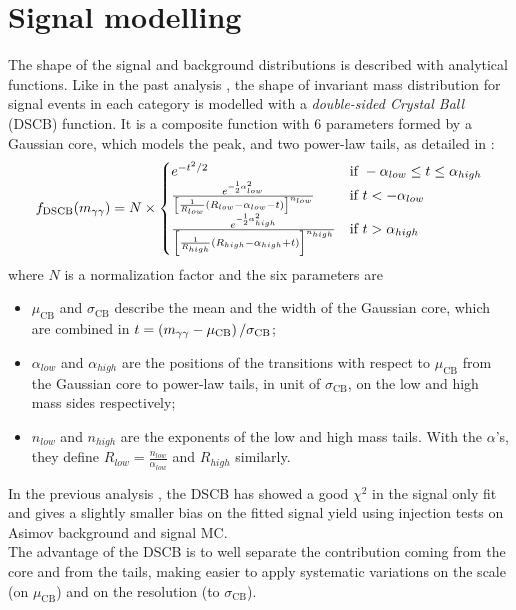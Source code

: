\section{Signal modelling}
\label{sec:signal_model}

The shape of the signal and background \myy distributions is described with analytical functions. Like in the past analysis \cite{Hasib:2238687}, the shape of \myy invariant mass distribution for signal events in each category is modelled with a \emph{double-sided Crystal Ball} (DSCB) function. It is a composite function with 6 parameters formed by a Gaussian core, which models the peak, and two power-law tails, as detailed in \Eqn{\ref{eq:DSCB}}:
\begin{align}
	f_\text{DSCB}(m_{\gamma\gamma}) = N \times
	\begin{cases}
		e^{-t^{2}/2} & \text{if } -\alpha_{low} \leq t \leq \alpha_{high} \\
		\frac{ e^{-{}^{1}_{2} \alpha_{low}^{2}} } { \left[ \frac{1}{R_{low}} \left(R_{low} - \alpha_{low} - t \right) \right]^{n_{low}} } & \text{if } t < -\alpha_{low} \\
		\frac{ e^{-{}^{1}_{2} \alpha_{high}^{2}} } { \left[ \frac{1}{R_{high}} \left(R_{high} - \alpha_{high} + t \right) \right]^{n_{high}} } & \text{if } t > \alpha_{high} \\
	\end{cases}
	\label{eq:DSCB}
\end{align}
where $N$ is a normalization factor and the six parameters are
\begin{itemize}
	\item $\mu_\text{CB}$ and $\sigma_\text{CB}$ describe the mean and the width of the Gaussian core, which are combined in $t = \left(m_{\gamma\gamma} - \mu_\text{CB}\right) / \sigma_\text{CB}$;
	\item $\alpha_{low}$ and $\alpha_{high}$ are the positions of the transitions with respect to $\mu_\text{CB}$ from the Gaussian core to power-law tails, in unit of $\sigma_\text{CB}$, on the low and high mass sides respectively;
	\item $n_{low}$ and $n_{high}$ are the exponents of the low and high mass tails. With the $\alpha$'s, they define $R_{low} = \frac{n_{low}}{\alpha_{low}}$ and $R_{high}$ similarly.
\end{itemize}

In the previous analysis \cite{Hasib:2238687}, the DSCB has showed a good $\chi^2$ in the signal only fit and gives a slightly smaller bias on the fitted signal yield using injection tests on Asimov background and signal MC. \\ The advantage of the DSCB is to well separate the contribution coming from the core and from the tails, making easier to apply systematic variations on the scale (on $\mu_\text{CB}$) and on the resolution (to $\sigma_\text{CB}$). \\

